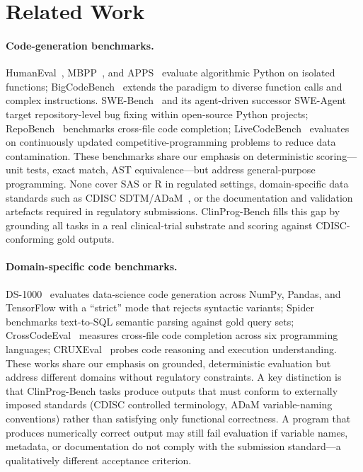 \section{Related Work}
\label{sec:related}

\paragraph{Code-generation benchmarks.}
HumanEval~\citep{chen2021codex}, MBPP~\citep{austin2021mbpp}, and
APPS~\citep{hendrycks2021apps} evaluate algorithmic Python on isolated
functions; BigCodeBench~\citep{zhuo2024bigcodebench} extends the paradigm to
diverse function calls and complex instructions.
SWE-Bench~\citep{jimenez2024swebench} and its agent-driven successor
SWE-Agent~\citep{yang2024swe} target repository-level bug fixing within
open-source Python projects; RepoBench~\citep{liu2024repobench} benchmarks
cross-file code completion; LiveCodeBench~\citep{livecodebench2024} evaluates
on continuously updated competitive-programming problems to reduce data
contamination.
These benchmarks share our emphasis on deterministic scoring---unit tests,
exact match, AST equivalence---but address general-purpose programming.
None cover SAS or R in regulated settings, domain-specific data standards
such as CDISC SDTM/ADaM~\citep{cdisc_sdtm_ig,cdisc_adam_ig}, or the
documentation and validation artefacts required in regulatory submissions.
ClinProg-Bench fills this gap by grounding all tasks in a real
clinical-trial substrate and scoring against CDISC-conforming gold outputs.

\paragraph{Domain-specific code benchmarks.}
DS-1000~\citep{lai2023ds1000} evaluates data-science code generation across
NumPy, Pandas, and TensorFlow with a ``strict'' mode that rejects syntactic
variants; Spider~\citep{yu2018spider} benchmarks text-to-SQL semantic parsing
against gold query sets; CrossCodeEval~\citep{ding2023crosscodeeval} measures
cross-file code completion across six programming languages;
CRUXEval~\citep{gu2024cruxeval} probes code reasoning and execution
understanding.
These works share our emphasis on grounded, deterministic evaluation but
address different domains without regulatory constraints.
A key distinction is that ClinProg-Bench tasks produce outputs that must
conform to externally imposed standards (CDISC controlled terminology, ADaM
variable-naming conventions) rather than satisfying only functional
correctness.
A program that produces numerically correct output may still fail evaluation
if variable names, metadata, or documentation do not comply with the
submission standard---a qualitatively different acceptance criterion.

